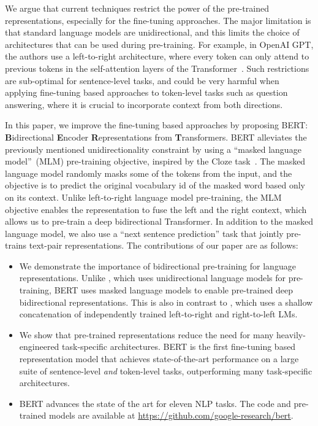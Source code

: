 \documentclass[11pt,a4paper]{article}
\newcommand\bert{BERT\xspace}
\begin{document}
We argue that current techniques restrict the power of the pre-trained representations, especially for the fine-tuning approaches. The major limitation is that standard language models are unidirectional, and this limits the choice of architectures that can be used during pre-training. For example, in OpenAI GPT, the authors use a left-to-right architecture, where every token can only attend to previous tokens in the self-attention layers of the Transformer~\cite{vaswani-etal:2017:_atten}. Such restrictions are sub-optimal for sentence-level tasks, and could be very harmful when applying fine-tuning based approaches to token-level tasks such as  question answering, where it is crucial to incorporate context from both directions.

In this paper, we improve the fine-tuning based approaches by proposing \bert: \textbf{B}idirectional \textbf{E}ncoder \textbf{R}epresentations from \textbf{T}ransformers. \bert alleviates the previously mentioned unidirectionality constraint by using a ``masked language model''~(MLM) pre-training objective, inspired by the Cloze task~\cite{taylor:1953:_cloze}. The masked language model randomly masks some of the tokens from the input, and the objective is to predict the original vocabulary id of the masked word based only on its context. Unlike left-to-right language model pre-training, the MLM objective enables the representation to fuse the left and the right context, which allows us to pre-train a deep bidirectional Transformer. In addition to the masked language model, we also use a ``next sentence prediction'' task that jointly pre-trains text-pair representations. The contributions of our paper are as follows:
\begin{itemize}[leftmargin=1em]
  \item We demonstrate the importance of bidirectional pre-training for language representations. Unlike \citet{radford-etal:2018}, which uses unidirectional language models for pre-training, \bert uses masked language models to enable pre-trained deep bidirectional representations. This is also in contrast to \citet{peters-etal:2018:_deep}, which uses a shallow concatenation of independently trained left-to-right and right-to-left LMs.
  \item We show that pre-trained representations reduce the need for many heavily-engineered task-specific architectures. \bert is the first fine-tuning based representation model that achieves state-of-the-art performance on a large suite of sentence-level {\em and} token-level tasks, outperforming many task-specific architectures.
  \item \bert advances the state of the art for eleven NLP tasks. 
The code and pre-trained models are available at \url{https://github.com/google-research/bert}.
\end{itemize}
 
\end{document}
